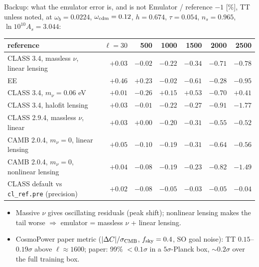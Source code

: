 \documentclass[aspectratio=169,10pt]{beamer}
\begin{document}
\begin{frame}{Backup: what the emulator error is, and is not}
\centering\scriptsize
Emulator / reference $-1$ [\%], TT unless noted, at $\omega_b=0.0224$, $\omega_{\rm cdm}=0.12$, $h=0.674$, $\tau=0.054$, $n_s=0.965$, $\ln10^{10}A_s=3.044$:

\vspace{0.3em}
\begin{tabular}{@{}lrrrrrr@{}}
\toprule
reference & $\ell=30$ & 500 & 1000 & 1500 & 2000 & 2500 \\
\midrule
CLASS 3.4, massless $\nu$, linear lensing & $+0.03$ & $-0.02$ & $-0.22$ & $-0.34$ & $-0.71$ & $-0.78$ \\
\quad EE & $+0.46$ & $+0.23$ & $-0.02$ & $-0.61$ & $-0.28$ & $-0.95$ \\
CLASS 3.4, $m_\nu=0.06$ eV & $+0.01$ & $-0.26$ & $+0.15$ & $+0.53$ & $-0.70$ & $+0.41$ \\
CLASS 3.4, halofit lensing & $+0.03$ & $-0.01$ & $-0.22$ & $-0.27$ & $-0.91$ & $-1.77$ \\
CLASS 2.9.4, massless $\nu$, linear & $+0.03$ & $+0.00$ & $-0.20$ & $-0.31$ & $-0.55$ & $-0.52$ \\
CAMB 2.0.4, $m_\nu=0$, linear lensing & $+0.05$ & $-0.10$ & $-0.19$ & $-0.31$ & $-0.64$ & $-0.56$ \\
CAMB 2.0.4, $m_\nu=0$, nonlinear lensing & $+0.04$ & $-0.08$ & $-0.19$ & $-0.23$ & $-0.82$ & $-1.49$ \\
\midrule
CLASS default vs \texttt{cl\_ref.pre} (precision) & $+0.02$ & $-0.08$ & $-0.05$ & $-0.03$ & $-0.05$ & $-0.04$ \\
\bottomrule
\end{tabular}

\vspace{0.5em}
\begin{itemize}\scriptsize
  \item Massive $\nu$ gives oscillating residuals (peak shift); nonlinear lensing makes the tail worse $\Rightarrow$ emulator = massless $\nu$ + linear lensing.
  \item CosmoPower paper metric ($|\Delta C|/\sigma_{\rm CMB}$, $f_{\rm sky}=0.4$, SO goal noise): TT $0.15$--$0.19\sigma$ above $\ell\approx1600$;
  paper: 99\% $<0.1\sigma$ in a $5\sigma$-Planck box, $\sim0.2\sigma$ over the full training box.
\end{itemize}
\end{frame}
\end{document}
